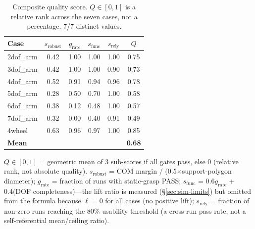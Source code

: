 \documentclass[conference]{IEEEtran}
\begin{document}
\begin{table}[ht]
\centering
\caption{Composite quality score. $Q \in [0,1]$ is a relative rank across the seven cases, not a percentage. 7/7 distinct values.}
\label{tab:composite}
\small
\begin{tabular}{l|cccc|c}
\toprule
\textbf{Case} & $s_{\text{robust}}$ & $g_{\text{rate}}$ & $s_{\text{func}}$ & $s_{\text{rely}}$ & \textbf{$Q$} \\
\midrule
2dof\_arm & 0.42 & 1.00 & 1.00 & 1.00 & 0.75 \\
3dof\_arm & 0.42 & 1.00 & 1.00 & 0.90 & 0.73 \\
4dof\_arm & 0.52 & 0.91 & 0.94 & 0.96 & 0.78 \\
5dof\_arm & 0.28 & 0.50 & 0.70 & 1.00 & 0.58 \\
6dof\_arm & 0.38 & 0.12 & 0.48 & 1.00 & 0.57 \\
7dof\_arm & 0.32 & 0.00 & 0.40 & 0.91 & 0.49 \\
4wheel & 0.63 & 0.96 & 0.97 & 1.00 & 0.85 \\
\midrule
\textbf{Mean} & & & & & \textbf{0.68} \\
\bottomrule
\end{tabular}
\vspace{1mm}
\footnotesize $Q \in [0,1]$ = geometric mean of 3 sub-scores if all gates pass, else 0 (relative rank, not absolute quality). $s_{\text{robust}}$ = COM margin / (0.5$\times$support-polygon diameter); $g_{\text{rate}}$ = fraction of runs with static-grasp PASS; $s_{\text{func}}$ = 0.6$g_{\text{rate}}$ + 0.4(DOF completeness)---the lift ratio is measured (\S\ref{sec:sim-limits}) but omitted from the formula because $\ell=0$ for all cases (no positive lift); $s_{\text{rely}}$ = fraction of non-zero runs reaching the 80\% usability threshold (a cross-run pass rate, not a self-referential mean/ceiling ratio).
\end{table}
\end{document}
